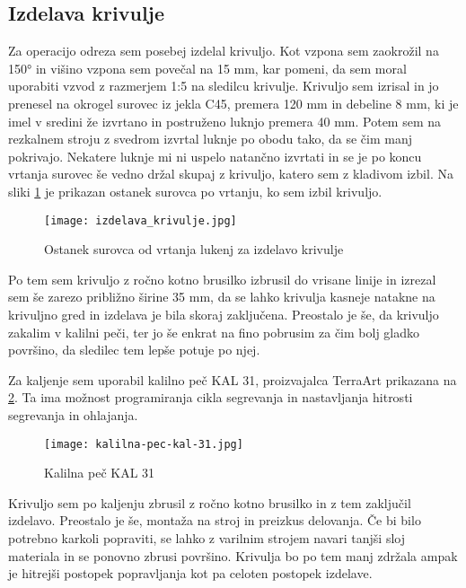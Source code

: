 \subsection{Izdelava krivulje}
Za operacijo odreza sem posebej izdelal krivuljo. Kot vzpona
sem zaokrožil na 150° in višino vzpona sem povečal na 15 mm,
kar pomeni, da sem moral uporabiti vzvod z razmerjem 1:5 na
sledilcu krivulje. Krivuljo sem izrisal in jo prenesel na
okrogel surovec iz jekla C45, premera 120 mm in debeline 8 mm, ki je imel
v sredini že izvrtano in postruženo luknjo premera 40 mm.
Potem sem na rezkalnem stroju z svedrom izvrtal luknje po obodu tako,
da se čim manj pokrivajo. Nekatere luknje mi ni uspelo natančno
izvrtati in se je po koncu vrtanja surovec še vedno držal skupaj
z krivuljo, katero sem z kladivom izbil. Na sliki \ref{izdelava_krivulje}
je prikazan ostanek surovca po vrtanju, ko sem izbil krivuljo.

\begin{figure}[H]
	\begin{center}
		\texttt{[image: izdelava\_krivulje.jpg]}
		\caption{Ostanek surovca od vrtanja lukenj za izdelavo krivulje
			\cite{lasten}}
		\label{izdelava_krivulje}
	\end{center}
\end{figure}

Po tem sem krivuljo z ročno kotno brusilko izbrusil do vrisane linije
in izrezal sem še zarezo približno širine 35 mm, da se lahko krivulja
kasneje natakne na krivuljno gred in izdelava je bila skoraj zaključena.
Preostalo je še, da  krivuljo zakalim v kalilni peči, ter jo
še enkrat na fino pobrusim za čim bolj gladko površino,
da sledilec tem lepše potuje po njej.

Za kaljenje sem uporabil kalilno peč KAL 31, proizvajalca TerraArt
prikazana na \ref{kalilna_pec_slika}. Ta ima možnost programiranja
cikla segrevanja in nastavljanja hitrosti segrevanja in ohlajanja.

\begin{figure}[H]
	\begin{center}
		\texttt{[image: kalilna-pec-kal-31.jpg]}
		\caption{Kalilna peč KAL 31
			\cite{kalilna_pec}}
		\label{kalilna_pec_slika}
	\end{center}
\end{figure}

Krivuljo sem po kaljenju zbrusil z ročno kotno brusilko in z tem
zaključil izdelavo. Preostalo je še, montaža na stroj in preizkus
delovanja. Če bi bilo potrebno karkoli popraviti, se lahko z
varilnim strojem navari tanjši sloj materiala in se ponovno zbrusi
površino. Krivulja bo po tem manj zdržala ampak je hitrejši postopek
popravljanja kot pa celoten postopek izdelave.
